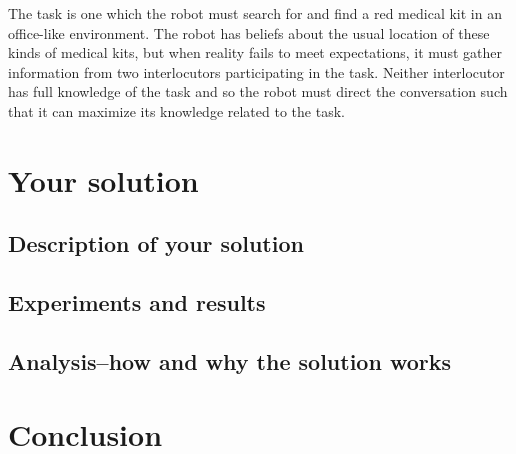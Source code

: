 \documentclass[12pt]{article}
\begin{document}
The task is one which the robot must search for and find a red medical
kit in an office-like environment. The robot has beliefs about the
usual location of these kinds of medical kits, but when reality fails
to meet expectations, it must gather information from two
interlocutors participating in the task. Neither interlocutor has full
knowledge of the task and so the robot must direct the conversation
such that it can maximize its knowledge related to the task.

\section{Your solution}
\subsection{Description of your solution}

\subsection{Experiments and results}


\subsection{Analysis--how and why the solution works}

\section{Conclusion}


{\small }
\end{document}
